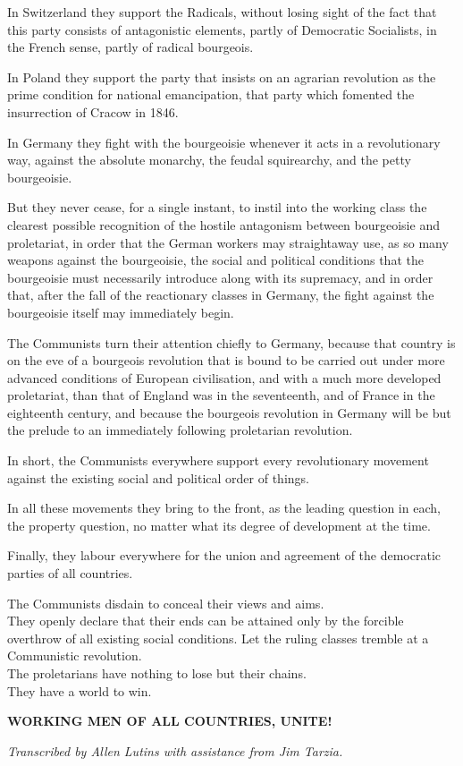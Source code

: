 \documentclass[, oneside]{article}   	%
\begin{document}
In Switzerland they support the Radicals, without losing sight of the fact that this party consists of antagonistic elements, partly of Democratic Socialists, in the French sense, partly of radical bourgeois.

In Poland they support the party that insists on an agrarian revolution as the prime condition for national emancipation, that party which fomented the insurrection of Cracow in 1846.

In Germany they fight with the bourgeoisie whenever it acts in a revolutionary way, against the absolute monarchy, the feudal squirearchy, and the petty bourgeoisie.

But they never cease, for a single instant, to instil into the working class the clearest possible recognition of the hostile antagonism between bourgeoisie and proletariat, in order that the German workers may straightaway use, as so many weapons against the bourgeoisie, the social and political conditions that the bourgeoisie must necessarily introduce along with its supremacy, and in order that, after the fall of the reactionary classes in Germany, the fight against the bourgeoisie itself may immediately begin.

The Communists turn their attention chiefly to Germany, because that country is on the eve of a bourgeois revolution that is bound to be carried out under more advanced conditions of European civilisation, and with a much more developed proletariat, than that of England was in the seventeenth, and of France in the eighteenth century, and because the bourgeois revolution in Germany will be but the prelude to an immediately following proletarian revolution.

In short, the Communists everywhere support every revolutionary movement against the existing social and political order of things.

In all these movements they bring to the front, as the leading question in each, the property question, no matter what its degree of development at the time.

Finally, they labour everywhere for the union and agreement of the democratic parties of all countries.

The Communists disdain to conceal their views and aims.\\
They openly declare that their ends can be attained only by
the forcible overthrow of all existing social conditions.
Let the ruling classes tremble at a Communistic revolution.\\
The proletarians have nothing to lose but their chains.\\
They have a world to win.

\large{\textbf{WORKING MEN OF ALL COUNTRIES, UNITE!}}

\vfill

\textit{Transcribed by Allen Lutins with assistance from Jim Tarzia.}
\end{document}
